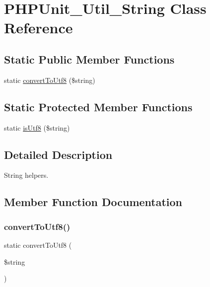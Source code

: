 \hypertarget{class_p_h_p_unit___util___string}{}\section{P\+H\+P\+Unit\+\_\+\+Util\+\_\+\+String Class Reference}
\label{class_p_h_p_unit___util___string}
\subsection*{Static Public Member Functions}
\begin{DoxyCompactItemize}
\item 
static \mbox{\hyperlink{class_p_h_p_unit___util___string_a2ccda9c0092e5bd36a1af151d1af305c}{convert\+To\+Utf8}} (\$string)
\end{DoxyCompactItemize}
\subsection*{Static Protected Member Functions}
\begin{DoxyCompactItemize}
\item 
static \mbox{\hyperlink{class_p_h_p_unit___util___string_a179507b167903e4bbdf95572e24bbe61}{is\+Utf8}} (\$string)
\end{DoxyCompactItemize}


\subsection{Detailed Description}
String helpers. 

\subsection{Member Function Documentation}
\mbox{\label{class_p_h_p_unit___util___string_a2ccda9c0092e5bd36a1af151d1af305c}} 
\subsubsection{\texorpdfstring{convert\+To\+Utf8()}{convertToUtf8()}}
{\footnotesize\ttfamily static convert\+To\+Utf8 (\begin{DoxyParamCaption}\item[{}]{\$string }\end{DoxyParamCaption})\hspace{0.3cm}{\ttfamily [static]}}

